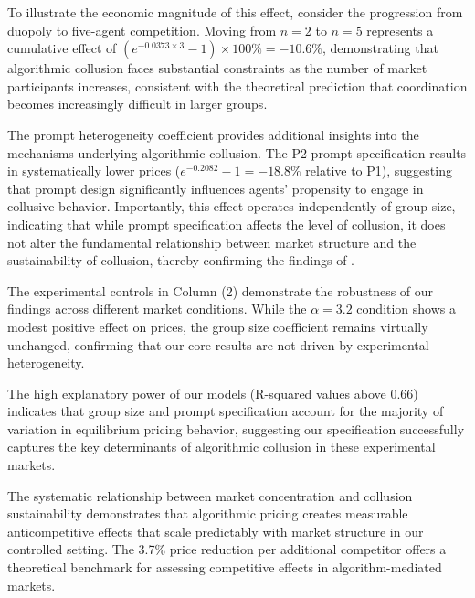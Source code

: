 To illustrate the economic magnitude of this effect, consider the progression from duopoly to five-agent competition. Moving from $n=2$ to $n=5$ represents a cumulative effect of $(e^{-0.0373 \times 3} - 1) \times 100\% = -10.6\%$, demonstrating that algorithmic collusion faces substantial constraints as the number of market participants increases, consistent with the theoretical prediction that coordination becomes increasingly difficult in larger groups.

The prompt heterogeneity coefficient provides additional insights into the mechanisms underlying algorithmic collusion. The P2 prompt specification results in systematically lower prices ($e^{-0.2082} - 1 = -18.8\%$ relative to P1), suggesting that prompt design significantly influences agents' propensity to engage in collusive behavior. Importantly, this effect operates independently of group size, indicating that while prompt specification affects the level of collusion, it does not alter the fundamental relationship between market structure and the sustainability of collusion, thereby confirming the findings of \textcite{fish_algorithmic_2025}.

The experimental controls in Column (2) demonstrate the robustness of our findings across different market conditions. While the $\alpha = 3.2$ condition shows a modest positive effect on prices, the group size coefficient remains virtually unchanged, confirming that our core results are not driven by experimental heterogeneity.

The high explanatory power of our models (R-squared values above 0.66) indicates that group size and prompt specification account for the majority of variation in equilibrium pricing behavior, suggesting our specification successfully captures the key determinants of algorithmic collusion in these experimental markets.

The systematic relationship between market concentration and collusion sustainability demonstrates that algorithmic pricing creates measurable anticompetitive effects that scale predictably with market structure in our controlled setting. The 3.7\% price reduction per additional competitor offers a theoretical benchmark for assessing competitive effects in algorithm-mediated markets.